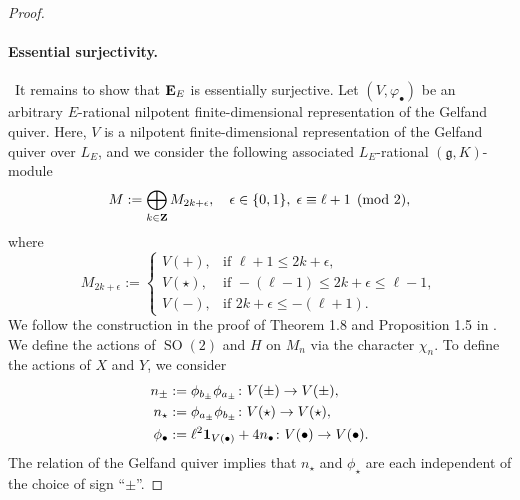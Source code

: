 \documentclass[a4paper,12pt,reqno]{amsart}
\newcommand{\ZZ}{{\rm\bf Z}}
\newcommand{\EE}{{\rm\bf E}}
\DeclareMathOperator{\SO}{\mathrm{SO}}
\theoremstyle{plain}
\theoremstyle{remark}
\begin{document}
\begin{proof}
    \paragraph{Essential surjectivity.}\ 
    It remains to show that $\EE_E$ is essentially surjective. Let $(V,\varphi_\bullet)$ be an arbitrary $E$-rational nilpotent finite-dimensional representation of the Gelfand quiver. Here, $V$ is a nilpotent finite-dimensional representation of the Gelfand quiver over $L_E$, and we consider the following associated $L_E$-rational $(\mathfrak{g}, K)$-module
    \[
    M:=\bigoplus_{k\in\ZZ} M_{2k+\epsilon},\quad \epsilon\in\{0,1\},\;\epsilon\equiv\ell+1\pmod{2},
    \]
    where
    \[
    M_{2k+\epsilon}:=
    \begin{cases}
      V(+), & \text{if }\ell+1\leq 2k+\epsilon,\\
      V(\star), & \text{if } -(\ell-1)\leq 2k+\epsilon\leq\ell-1,\\
      V(-), & \text{if } 2k+\epsilon\leq -(\ell+1).
    \end{cases}
    \]
    We follow the construction in the proof of Theorem 1.8 and Proposition 1.5 in \cite{ABR}. We define the actions of $\SO(2)$ and $H$ on $M_n$ via the character $\chi_n$. To define the actions of $X$ and $Y$, we consider
    \begin{align*}
    n_{\pm}&:=\phi_{b_\pm}\phi_{a_\pm}\colon V(\pm)\to V(\pm),\\
    n_{\star}&:=\phi_{a_\pm}\phi_{b_\pm}\colon V(\star)\to V(\star),\\
    \phi_{\bullet}&:=\ell^2{\bf1}_{V(\bullet)}+4n_{\bullet}\colon V(\bullet)\to V(\bullet).
    \end{align*}
    The relation of the Gelfand quiver implies that $n_{\star}$ and $\phi_{\star}$ are each independent of the choice of sign ``$\pm$''.


\end{proof}
\end{document}
